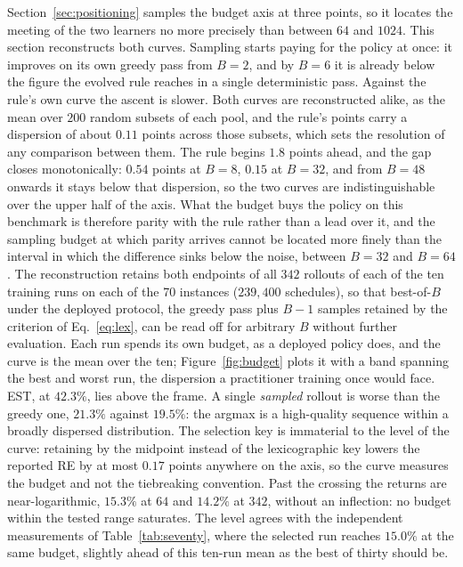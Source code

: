 \documentclass[preprint,12pt]{elsarticle}
\theoremstyle{definition}
\theoremstyle{remark}
\begin{document}
Section~\ref{sec:positioning} samples the budget axis at three
points, so it locates the meeting of the two learners no more
precisely than between $64$ and $1024$. This section reconstructs
both curves. Sampling starts paying for the policy at once: it
improves on its own greedy pass from $B{=}2$, and by $B{=}6$ it is
already below the figure the evolved rule reaches in a single
deterministic pass. Against the rule's own curve the ascent is
slower. Both curves are reconstructed alike, as the mean over $200$
random subsets of each pool, and the rule's points carry a dispersion
of about $0.11$ points across those subsets, which sets the
resolution of any comparison between them. The rule begins $1.8$
points ahead, and the gap closes monotonically: $0.54$ points at
$B{=}8$, $0.15$ at $B{=}32$, and from $B{=}48$ onwards it stays below
that dispersion, so the two curves are indistinguishable over the
upper half of the axis. What the budget buys the policy on this
benchmark is therefore parity with the rule rather than a lead over
it, and the sampling budget at which parity arrives cannot be located
more finely than the interval in which the difference sinks below the
noise, between $B{=}32$ and $B{=}64$. The reconstruction retains
both endpoints of
all $342$ rollouts of each of the ten training runs on each of the 70
instances ($239{,}400$ schedules), so that best-of-$B$ under the
deployed protocol, the greedy pass plus $B-1$ samples retained by the
criterion of Eq.~\eqref{eq:lex}, can be read
off for arbitrary $B$ without further evaluation. Each run spends its
own budget, as a deployed policy does, and the curve is the mean over
the ten; Figure~\ref{fig:budget} plots it with a band spanning the
best and worst run, the dispersion a practitioner training once would
face. EST, at $42.3\%$, lies above the frame. A single \emph{sampled}
rollout is worse than the greedy one, $21.3\%$ against $19.5\%$: the
argmax is a high-quality sequence within a broadly dispersed
distribution. The selection key is immaterial to the level of the
curve: retaining by the midpoint instead of the lexicographic key
lowers the reported RE by at most $0.17$ points anywhere on the
axis, so the curve measures the budget and not the tiebreaking
convention. Past the crossing the returns are near-logarithmic,
$15.3\%$ at $64$ and $14.2\%$ at $342$, without an inflection: no
budget within the tested range saturates. The level agrees with the
independent measurements of Table~\ref{tab:seventy}, where the
selected run reaches $15.0\%$ at the same budget, slightly ahead of
this ten-run mean as the best of thirty should be.
\end{document}
